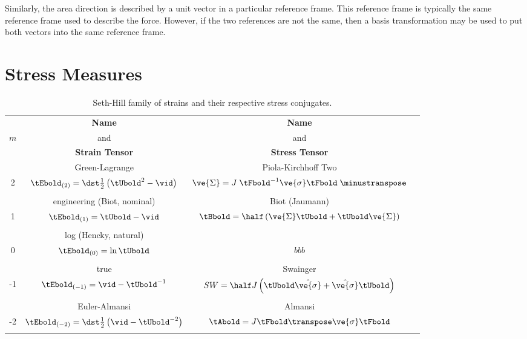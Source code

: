 Similarly, the area direction is described by a unit vector
in a particular reference frame.  This reference frame is typically
the same reference frame used to describe the force.  However, if
the two references are not the same, then a basis transformation may
be used to put both vectors into the same reference frame. 

\section{Stress Measures}
\begin{table}[htb]
\caption{Seth-Hill family of strains 
and their respective stress conjugates.}
\label{tab:table_of_conjugate_stress}
\begin{center}
\begin{tabular}{|c|c|c|c|} \hline
     & {\bf Name} & {\bf Name} \\ 
 $m$ & and & and \\ 
     & {\bf Strain Tensor} & {\bf Stress Tensor} \\ \hline \hline
 & Green-Lagrange & Piola-Kirchhoff Two \\
 2  
   & $\tEbold_{(2)} = \dst\frac{1}{2}\left(\tUbold^2 - \vid\right)$ 
   & $\ve{\Sigma} = J \;\tFbold^{-1} \ve{\sigma} \tFbold\;\minustranspose$
   \\
   & & \\ \hline
 & engineering (Biot, nominal) & Biot (Jaumann) \\
 1  
   & $\tEbold_{(1)} = \tUbold - \vid$
   & $\tBbold = 
   \half \left(\ve{\Sigma} \tUbold + \tUbold \ve{\Sigma} \right)$
  \\
   & & \\ \hline
 & log (Hencky, natural) & \\
 0  
   & $\tEbold_{(0)} = \ln\tUbold$
   & $bbb$
   \\
   & & \\ \hline
 & true & Swainger \\
 -1  
   & $\tEbold_{(-1)} = \vid - \tUbold^{-1}$
   & $SW = \half J \left(\tUbold \hat{\ve{\sigma}} + 
           \hat{\ve{\sigma}} \tUbold \right)$
   \\
   & & \\ \hline
 & Euler-Almansi & Almansi\\
 -2  
   & $\tEbold_{(-2)} = \dst\frac{1}{2}\left(\vid - \tUbold^{-2}\right)$
   & $\tAbold = J \tFbold\transpose \ve{\sigma} \tFbold$
   \\
   & & \\ \hline
\end{tabular}
\end{center}
\end{table}

